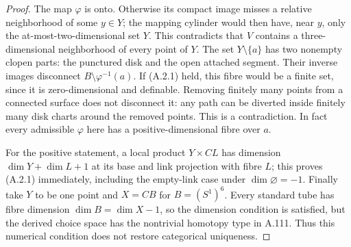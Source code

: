 \begin{proof}
The map $\varphi$ is onto. Otherwise its compact image misses a
relative neighborhood of some $y\in Y$; the mapping cylinder would
then have, near $y$, only the at-most-two-dimensional set $Y$. This
contradicts that $V$ contains a three-dimensional neighborhood of
every point of $Y$. The set $Y\setminus\{a\}$ has two nonempty
clopen parts: the punctured disk and the open attached segment.
Their inverse images disconnect $B\setminus\varphi^{-1}(a)$.
If (A.2.1) held, this fibre would be a finite set, since it is
zero-dimensional and definable. Removing finitely many points from
a connected surface does not disconnect it: any path can be diverted
inside finitely many disk charts around the removed points. This is
a contradiction. In fact every admissible $\varphi$ here has a
positive-dimensional fibre over $a$.

For the positive statement, a local product
$Y\times CL$ has dimension $\dim Y+\dim L+1$ at its base and
link projection with fibre $L$; this proves (A.2.1) immediately,
including the empty-link case under $\dim\varnothing=-1$.
Finally take $Y$ to be one point and $X=CB$ for $B=(S^1)^6$.
Every standard tube has fibre dimension $\dim B=\dim X-1$, so the
dimension condition is satisfied, but the derived choice space has
the nontrivial homotopy type in A.111. Thus this numerical condition
does not restore categorical uniqueness.
\end{proof}

